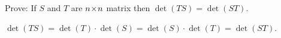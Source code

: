 
\begin{Exercise}[
name={},
title={}, 
difficulty=0,
origin={\cite{JH}}]
Prove: If $S$ and $T$ are $n \! \times \! n$ matrix then $\det(TS)=\det(ST)$.  
\end{Exercise}

\begin{Answer}
\( \det(TS)=\det(T)\cdot\det(S)=\det(S)\cdot\det(T)=\det(ST) \).  
\end{Answer}
